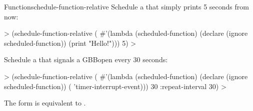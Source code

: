 \begin{functiondoc}{Function}{schedule-function-relative}
%
\fnexamples
%
Schedule a  that simply prints  
5 seconds from now:
%
\W\supp
\begin{example}
  > (schedule-function-relative
      (
        #'(lambda (scheduled-function)
            (declare (ignore scheduled-function))
            (print "Hello!")))
       5)
  >
\end{example}
%
%
%
%
Schedule a  that signals a GBBopen
 every 30 seconds:
%
\W\supp\notpretop
\begin{example}
  > (schedule-function-relative
      (
        #'(lambda (scheduled-function)
            (declare (ignore scheduled-function))
            ( 'timer-interrupt-event)))
      30
      :repeat-interval 30)
  >
\end{example}

\fnnote The form  is equivalent to
.

\end{functiondoc}


